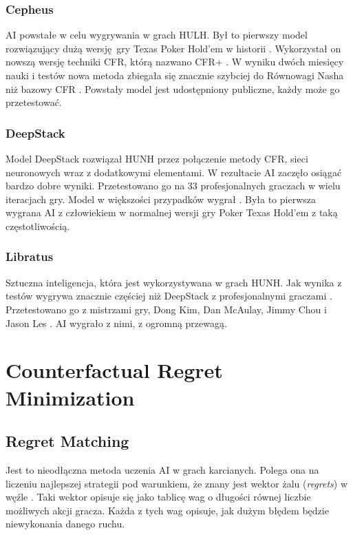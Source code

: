 \documentclass[12pt,oneside,a4paper]{report}
\begin{document}
\subsubsection{Cepheus}

AI powstałe w celu wygrywania w grach HULH. Był to pierwszy model rozwiązujący dużą wersję gry Texas
Poker Hold'em w historii \cite{cepheus}.  Wykorzystał on nowszą wersję techniki CFR, którą nazwano CFR+
\cite{cepheus}. W wyniku dwóch miesięcy nauki i testów nowa metoda zbiegała się znacznie szybciej do
Równowagi Nasha niż bazowy CFR \cite{cepheus}. Powstały model jest udostępniony publiczne, każdy
może go przetestować.    

\subsubsection{DeepStack}

Model DeepStack rozwiązał HUNH przez połączenie metody CFR, sieci neuronowych wraz z dodatkowymi
elementami. W rezultacie AI zaczęło osiągać bardzo dobre wyniki.
Przetestowano go na 33 profesjonalnych graczach w wielu iteracjach gry. Model w większości
przypadków wygrał \cite{ds}. Była to pierwsza wygrana AI z człowiekiem w normalnej 
wersji gry Poker Texas Hold'em z taką częstotliwością.

\subsubsection{Libratus}

Sztuczna inteligencja, która jest wykorzystywana w grach HUNH. Jak wynika z
testów wygrywa znacznie częściej niż DeepStack z profesjonalnymi graczami \cite{libratus}.
Przetestowano go z mistrzami gry, Dong Kim, Dan McAulay, Jimmy Chou 
i Jason Les \cite{libratus}. AI wygrało z nimi, z ogromną przewagą.


\section{Counterfactual Regret Minimization}

\subsection{Regret Matching}

Jest to nieodłączna metoda uczenia AI w grach karcianych. Polega ona na liczeniu najlepszej 
strategii pod warunkiem, że znany jest wektor żalu (\emph{regrets}) w węźle \cite{CFR}.
Taki wektor opisuje się jako tablicę wag o długości równej liczbie możliwych akcji gracza. Każda z 
tych wag opisuje, jak dużym błędem będzie niewykonania danego ruchu.
\end{document}
